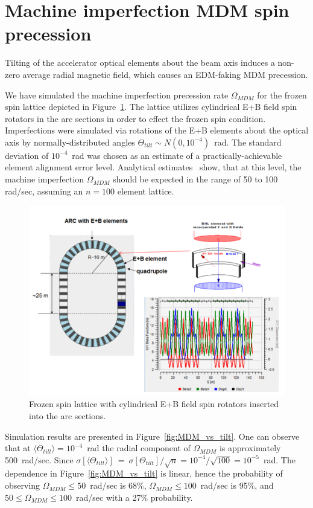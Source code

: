 \documentclass[a4paper]{jpconf}
\newcommand{\avg}[1]{\langle{#1}\rangle}
\newcommand{\W}{\Omega}
\begin{document}
\section{Machine imperfection MDM spin precession}
Tilting of the accelerator optical elements about the beam axis induces a non-zero average radial magnetic field, which causes an EDM-faking MDM precession. 

We have simulated the machine imperfection precession rate $\W_{MDM}$ for the frozen spin lattice depicted in Figure~\ref{fig:Lattice}. The lattice utilizes cylindrical E+B field spin rotators in the arc sections in order to effect the frozen spin condition. Imperfections were simulated via rotations of the E+B elements about the optical axis by normally-distributed angles $\Theta_{tilt}\sim N(0,10^{-4})$~rad. The standard deviation of $10^{-4}$~rad was chosen as an estimate of a practically-achievable element alignment error level. Analytical estimates~\cite{Senichev:FDM} show, that at this level, the machine imperfection $\W_{MDM}$ should be expected in the range of 50 to 100 rad/sec, assuming an $n=100$ element lattice.

\begin{figure}[h]\centering
	\includegraphics[width=.75\linewidth]{Figures/BNL}\hspace{3mm}%
	\begin{minipage}[b]{.2\linewidth}\caption{Frozen spin lattice with cylindrical E+B field spin rotators inserted into the arc sections.\label{fig:Lattice}}
	\end{minipage}
\end{figure}

Simulation results are presented in Figure~\ref{fig:MDM_vs_tilt}. One can observe that at $\avg{\Theta_{tilt}}=10^{-4}$~rad the radial component of $\W_{MDM}$ is approximately 500~rad/sec. 
Since $\sigma[\avg{\Theta_{tilt}}]~=~\sigma[\Theta_{tilt}]/\sqrt{n} = 10^{-4}/\sqrt{100} = 10^{-5}$~rad. The dependence in Figure~\ref{fig:MDM_vs_tilt} is linear, hence the probability of observing $\W_{MDM}\le 50$~rad/sec is 68\%, $\W_{MDM}\le 100$~rad/sec is 95\%, and $50\le\W_{MDM}\le100$~rad/sec with a 27\% probability.
\end{document}
